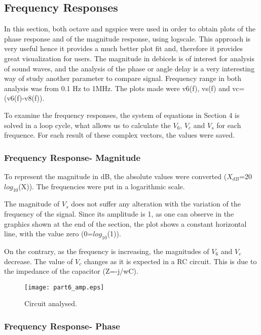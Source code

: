 \subsection{Frequency Responses}

In this section, both octave and ngspice were used in order to obtain plots of the phase response and of the magnitude response, using logscale. This approach is very useful hence it provides a much better plot fit and, therefore it provides great visualization for users. The magnitude in debicels is of interest for analysis of sound waves, and the analysis of the phase or angle delay is a very interesting way of study another parameter to compare signal. Frequency range in both analysis was from 0.1 Hz to 1MHz. The plots made were v6(f), vs(f) and vc=(v6(f)-v8(f)).



To examine the frequency responses, the system of equations in Section 4 is solved in a loop cycle, what allows us to calculate the $V_6$, $V_c$ and $V_s$ for each frequence. For each result of these complex vectors, the values were saved.

\subsubsection{Frequency Response- Magnitude}

To represent the magnitude in dB, the absolute values were converted ($X_{dB}$=20$log_{10}$(X)). The frequencies were put in a logarithmic scale.

The magnitude of $V_s$ does not suffer any alteration with the variation of the frequency of the signal. Since its amplitude is 1, as one can observe in the graphics shown at the end of the section, the plot shows a constant horizontal line, with the value zero (0=$log_{10}$(1)).

On the contrary, as the frequency is increasing, the magnitudes of $V_6$ and $V_c$ decrease. The value of $V_c$ changes as it is expected in a RC circuit. This is due to the impedance of the capacitor (Z=-j/wC).

\begin{figure}[h] \centering
\texttt{[image: part6\_amp.eps]}
\caption{Circuit analysed.}
\label{Magnitude response.}
\end{figure}

\subsubsection{Frequency Response- Phase}


